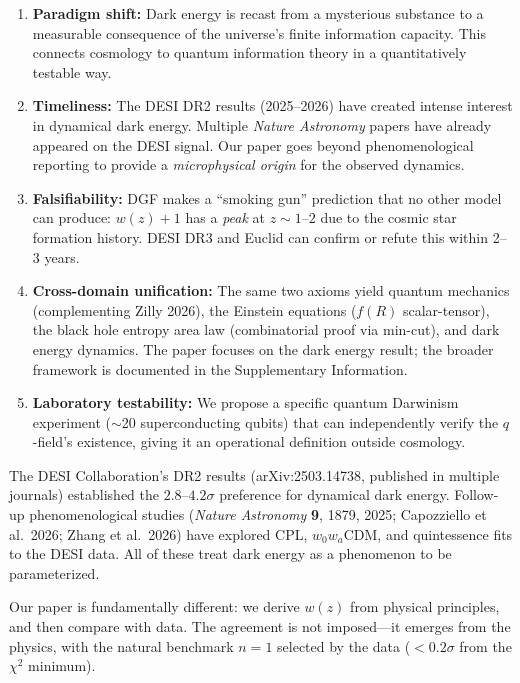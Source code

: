 \documentclass[12pt]{article}
\begin{document}
\begin{enumerate}
\item {\bf Paradigm shift:} Dark energy is recast from a mysterious substance to a measurable consequence of the universe's finite information capacity. This connects cosmology to quantum information theory in a quantitatively testable way.

\item {\bf Timeliness:} The DESI DR2 results (2025--2026) have created intense interest in dynamical dark energy. Multiple {\it Nature Astronomy} papers have already appeared on the DESI signal. Our paper goes beyond phenomenological reporting to provide a {\it microphysical origin} for the observed dynamics.

\item {\bf Falsifiability:} DGF makes a ``smoking gun'' prediction that no other model can produce: $w(z)+1$ has a {\it peak} at $z\sim1$--$2$ due to the cosmic star formation history. DESI DR3 and Euclid can confirm or refute this within 2--3 years.

\item {\bf Cross-domain unification:} The same two axioms yield quantum mechanics (complementing Zilly 2026), the Einstein equations ($f(R)$ scalar-tensor), the black hole entropy area law (combinatorial proof via min-cut), and dark energy dynamics. The paper focuses on the dark energy result; the broader framework is documented in the Supplementary Information.

\item {\bf Laboratory testability:} We propose a specific quantum Darwinism experiment ($\sim$20 superconducting qubits) that can independently verify the $q$-field's existence, giving it an operational definition outside cosmology.
\end{enumerate}

\vspace{10pt}


The DESI Collaboration's DR2 results (arXiv:2503.14738, published in multiple journals) established the $2.8$--$4.2\sigma$ preference for dynamical dark energy. Follow-up phenomenological studies ({\it Nature Astronomy} {\bf 9}, 1879, 2025; Capozziello et al.\ 2026; Zhang et al.\ 2026) have explored CPL, $w_0w_a$CDM, and quintessence fits to the DESI data. All of these treat dark energy as a phenomenon to be parameterized.

Our paper is fundamentally different: we derive $w(z)$ from physical principles, and then compare with data. The agreement is not imposed---it emerges from the physics, with the natural benchmark $n=1$ selected by the data ($<0.2\sigma$ from the $\chi^2$ minimum).
\end{document}
